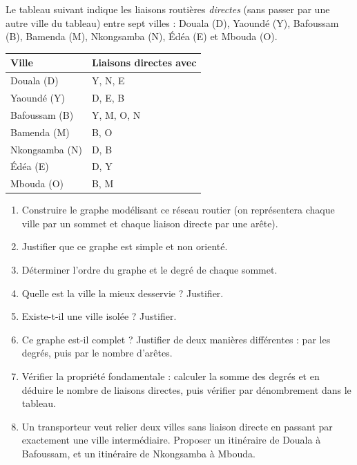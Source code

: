 \documentclass[11pt]{article}
\begin{document}
\begin{exercice}
Le tableau suivant indique les liaisons routières \emph{directes} (sans passer par une autre ville du tableau) entre sept villes : Douala (D), Yaoundé (Y), Bafoussam (B), Bamenda (M), Nkongsamba (N), Édéa (E) et Mbouda (O).
\begin{center}
\begin{tabularx}{\linewidth}{|l|X|}\hline
\rowcolor{popblueL} \textbf{Ville} & \textbf{Liaisons directes avec} \\ \hline
Douala (D) & Y, N, E \\ \hline
Yaoundé (Y) & D, E, B \\ \hline
Bafoussam (B) & Y, M, O, N \\ \hline
Bamenda (M) & B, O \\ \hline
Nkongsamba (N) & D, B \\ \hline
Édéa (E) & D, Y \\ \hline
Mbouda (O) & B, M \\ \hline
\end{tabularx}
\end{center}
\begin{enumerate}
\item Construire le graphe modélisant ce réseau routier (on représentera chaque ville par un sommet et chaque liaison directe par une arête).
\item Justifier que ce graphe est simple et non orienté.
\item Déterminer l'ordre du graphe et le degré de chaque sommet.
\item Quelle est la ville la mieux desservie ? Justifier.
\item Existe-t-il une ville isolée ? Justifier.
\item Ce graphe est-il complet ? Justifier de deux manières différentes : par les degrés, puis par le nombre d'arêtes.
\item Vérifier la propriété fondamentale : calculer la somme des degrés et en déduire le nombre de liaisons directes, puis vérifier par dénombrement dans le tableau.
\item Un transporteur veut relier deux villes sans liaison directe en passant par exactement une ville intermédiaire. Proposer un itinéraire de Douala à Bafoussam, et un itinéraire de Nkongsamba à Mbouda.
\end{enumerate}
\end{exercice}
\end{document}
